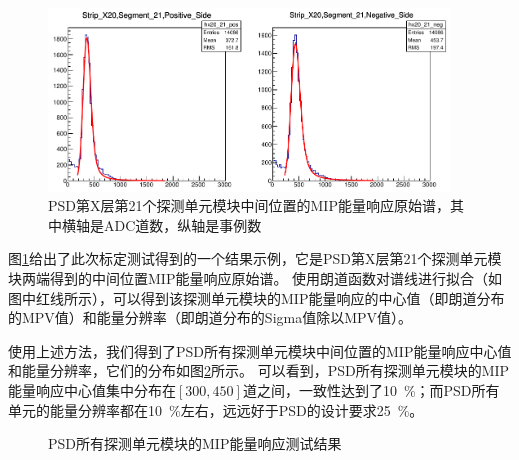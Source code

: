 \begin{figure}[htbp]
	\centering
	\includegraphics[width=0.95\textwidth]{chap/cosmic_ray/fig/mip_example.png}
	\caption{PSD第X层第21个探测单元模块中间位置的MIP能量响应原始谱，其中横轴是ADC道数，纵轴是事例数}
	\label{fig:cosmic_ray:mip_example}
\end{figure}
图\ref{fig:cosmic_ray:mip_example}给出了此次标定测试得到的一个结果示例，它是PSD第X层第21个探测单元模块两端得到的中间位置MIP能量响应原始谱。
使用朗道函数对谱线进行拟合（如图中红线所示），可以得到该探测单元模块的MIP能量响应的中心值（即朗道分布的MPV值）和能量分辨率（即朗道分布的Sigma值除以MPV值）。

使用上述方法，我们得到了PSD所有探测单元模块中间位置的MIP能量响应中心值和能量分辨率，它们的分布如图\ref{fig:cosmic_ray:mip_results}所示。
可以看到，PSD所有探测单元模块的MIP能量响应中心值集中分布在$[300,450]$道之间，一致性达到了\SI{10}{\percent}；而PSD所有单元的能量分辨率都在\SI{10}{\percent}左右，远远好于PSD的设计要求\SI{25}{\percent}。
\begin{figure}[htb]
\centering
{}
\caption{PSD所有探测单元模块的MIP能量响应测试结果}
\label{fig:cosmic_ray:mip_results}
\end{figure}

